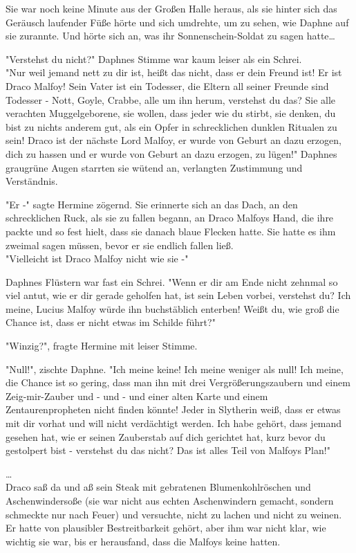 {Sie war noch keine Minute aus der Großen Halle heraus, als sie hinter sich das Geräusch laufender Füße hörte und sich umdrehte, um zu sehen, wie Daphne auf sie zurannte. Und hörte sich an, was ihr Sonnenschein-Soldat zu sagen hatte…

"Verstehst du nicht?" Daphnes Stimme war kaum leiser als ein Schrei.\\ "Nur weil jemand nett zu dir ist, heißt das nicht, dass er dein Freund ist! Er ist Draco Malfoy! Sein Vater ist ein Todesser, die Eltern all seiner Freunde sind Todesser - Nott, Goyle, Crabbe, alle um ihn herum, verstehst du das? Sie alle verachten Muggelgeborene, sie wollen, dass jeder wie du stirbt, sie denken, du bist zu nichts anderem gut, als ein Opfer in schrecklichen dunklen Ritualen zu sein! Draco ist der nächste Lord Malfoy, er wurde von Geburt an dazu erzogen, dich zu hassen und er wurde von Geburt an dazu erzogen, zu lügen!" Daphnes graugrüne Augen starrten sie wütend an, verlangten Zustimmung und Verständnis.

"Er -" sagte Hermine zögernd. Sie erinnerte sich an das Dach, an den schrecklichen Ruck, als sie zu fallen begann, an Draco Malfoys Hand, die ihre packte und so fest hielt, dass sie danach blaue Flecken hatte. Sie hatte es ihm zweimal sagen müssen, bevor er sie endlich fallen ließ.\\ "Vielleicht ist Draco Malfoy nicht wie sie -"

Daphnes Flüstern war fast ein Schrei. "Wenn er dir am Ende nicht zehnmal so viel antut, wie er dir gerade geholfen hat, ist sein Leben vorbei, verstehst du? Ich meine, Lucius Malfoy würde ihn buchstäblich enterben! Weißt du, wie groß die Chance ist, dass er nicht etwas im Schilde führt?"

"Winzig?", fragte Hermine mit leiser Stimme.

"Null!", zischte Daphne. "Ich meine keine! Ich meine weniger als null! Ich meine, die Chance ist so gering, dass man ihn mit drei Vergrößerungszaubern und einem Zeig-mir-Zauber und - und - und einer alten Karte und einem Zentaurenpropheten nicht finden könnte! Jeder in Slytherin weiß, dass er etwas mit dir vorhat und will nicht verdächtigt werden. Ich habe gehört, dass jemand gesehen hat, wie er seinen Zauberstab auf dich gerichtet hat, kurz bevor du gestolpert bist - verstehst du das nicht? Das ist alles Teil von Malfoys Plan!"

…\\ Draco saß da und aß sein Steak mit gebratenen Blumenkohlröschen und Aschenwindersoße (sie war nicht aus echten Aschenwindern gemacht, sondern schmeckte nur nach Feuer) und versuchte, nicht zu lachen und nicht zu weinen. Er hatte von plausibler Bestreitbarkeit gehört, aber ihm war nicht klar, wie wichtig sie war, bis er herausfand, dass die Malfoys keine hatten.

}
